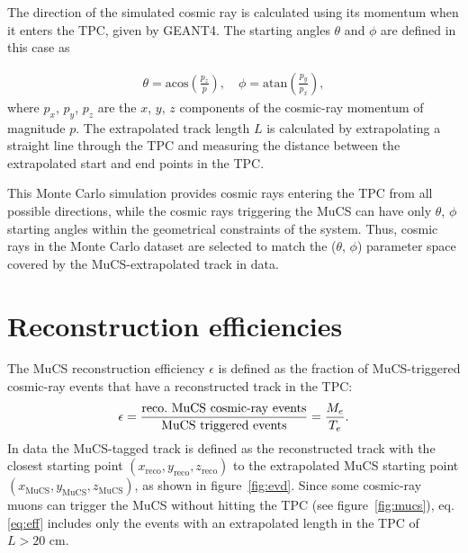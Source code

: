 \documentclass[a4paper,11pt]{article}
\def\myhyphen{{\hbox{-}}}
\begin{document}
The direction of the simulated cosmic ray is calculated using its momentum when it enters the TPC, given by GEANT4. The starting angles $\theta$ and $\phi$ are defined in this case as

\begin{align}\label{eq:angles_mc}
  \theta = \mathrm{acos}\left(\frac{p_{z}}{p}\right), \quad
  \phi = \mathrm{atan}\left(\frac{p_{y}}{p_{x}}\right),
\end{align}
where $p_{x}$, $p_{y}$, $p_{z}$ are the $x$, $y$, $z$ components of the cosmic-ray momentum of magnitude $p$.
The extrapolated track length $L$ is calculated by extrapolating a straight line through the TPC and measuring the distance between the extrapolated start and end points in the TPC.

This Monte Carlo simulation provides cosmic rays entering the TPC from all possible directions, while the cosmic rays triggering the MuCS can have only $\theta$, $\phi$ starting angles within the geometrical constraints of the system. Thus, cosmic rays in the Monte Carlo dataset are selected to match the ($\theta$, $\phi$) parameter space covered by the MuCS-extrapolated track in data.


\section{Reconstruction efficiencies}\label{sec:reco}

The MuCS reconstruction efficiency $\epsilon$ is defined as the fraction of MuCS-triggered cosmic-ray events that have a reconstructed track in the TPC:
\begin{equation}\label{eq:eff}
  \epsilon = \frac{\mathrm{reco.~MuCS~cosmic\myhyphen ray~events}}{\mathrm{MuCS~triggered~events}}=\frac{M_{e}}{T_{e}}.
\end{equation}
In data the MuCS-tagged track is defined as the reconstructed track with the closest starting point $(x_{\mathrm{reco}},y_{\mathrm{reco}},z_{\mathrm{reco}})$ to the extrapolated MuCS starting point $(x_{\mathrm{MuCS}},y_{\mathrm{MuCS}},z_{\mathrm{MuCS}})$, as shown in figure~\ref{fig:evd}. Since some cosmic-ray muons can trigger the MuCS without hitting the TPC (see figure~\ref{fig:mucs}), eq. \eqref{eq:eff} includes only the events with an extrapolated length in the TPC of $L > 20$ cm.%
\end{document}
